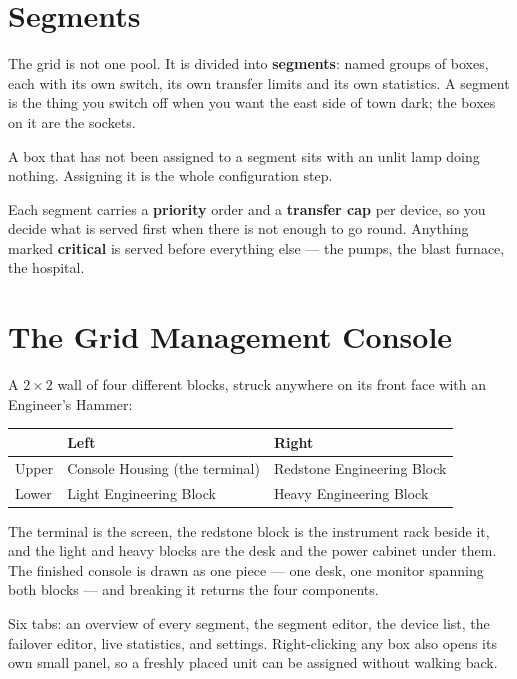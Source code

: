 \section{Segments}

The grid is not one pool. It is divided into \textbf{segments}: named groups of boxes, each with its
own switch, its own transfer limits and its own statistics. A segment is the thing you switch off
when you want the east side of town dark; the boxes on it are the sockets.

A box that has not been assigned to a segment sits with an unlit lamp doing nothing. Assigning it is
the whole configuration step.

Each segment carries a \textbf{priority} order and a \textbf{transfer cap} per device, so you decide
what is served first when there is not enough to go round. Anything marked \textbf{critical} is
served before everything else --- the pumps, the blast furnace, the hospital.

\section{The Grid Management Console}

A $2\times2$ wall of four different blocks, struck anywhere on its front face with an Engineer's
Hammer:

\begin{center}
\small
\begin{tabular}{@{}lll@{}}
\toprule
 & Left & Right \\
\midrule
Upper & Console Housing (the terminal) & Redstone Engineering Block \\
Lower & Light Engineering Block & Heavy Engineering Block \\
\bottomrule
\end{tabular}
\end{center}

\noindent The terminal is the screen, the redstone block is the instrument rack beside it, and the
light and heavy blocks are the desk and the power cabinet under them. The finished console is drawn
as one piece --- one desk, one monitor spanning both blocks --- and breaking it returns the four
components.

Six tabs: an overview of every segment, the segment editor, the device list, the failover editor,
live statistics, and settings. Right-clicking any box also opens its own small panel, so a freshly
placed unit can be assigned without walking back.


